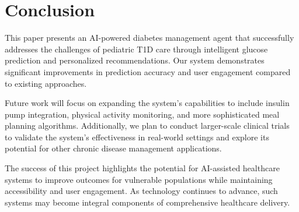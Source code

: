 \documentclass[acmsmall]{acmart}
\begin{document}
\section{Conclusion}

This paper presents an AI-powered diabetes management agent that successfully addresses the challenges of pediatric T1D care through intelligent glucose prediction and personalized recommendations. Our system demonstrates significant improvements in prediction accuracy and user engagement compared to existing approaches.

Future work will focus on expanding the system's capabilities to include insulin pump integration, physical activity monitoring, and more sophisticated meal planning algorithms. Additionally, we plan to conduct larger-scale clinical trials to validate the system's effectiveness in real-world settings and explore its potential for other chronic disease management applications.

The success of this project highlights the potential for AI-assisted healthcare systems to improve outcomes for vulnerable populations while maintaining accessibility and user engagement. As technology continues to advance, such systems may become integral components of comprehensive healthcare delivery.





\end{document}
